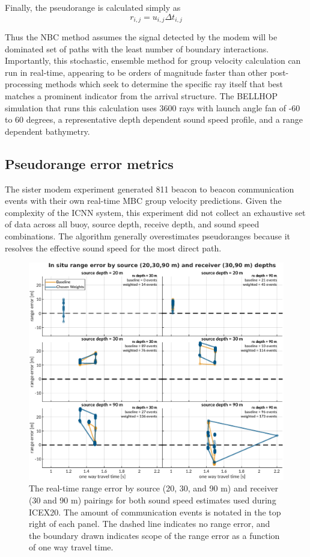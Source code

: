 Finally, the pseudorange is calculated simply as
\begin{equation}
r_{i,j} = u_{i,j} \Delta t_{i,j} 
\end{equation}

Thus the NBC method assumes the signal detected by the modem will be dominated set of paths with the least number of boundary interactions.
Importantly, this stochastic, ensemble method for group velocity calculation can run in real-time, appearing to be orders of magnitude faster than other post-processing methods which seek to determine the specific ray itself that best matches a prominent indicator from the arrival structure.
The BELLHOP simulation that runs this calculation uses 3600 rays with launch angle fan of -60 to 60 degrees, a representative depth dependent sound speed profile, and a range dependent bathymetry. 

\subsection{Pseudorange error metrics}

The sister modem experiment generated 811 beacon to beacon communication events with their own real-time MBC group velocity predictions.
Given the complexity of the ICNN system, this experiment did not collect an exhaustive set of data across all buoy, source depth, receive depth, and sound speed combinations.
 The algorithm generally overestimates pseudoranges because it resolves the effective sound speed for the most direct path.

\begin{figure}[h!]
  \centering
  \includegraphics[width=\reprintcolumnwidth]{figs/range-error-insitu.pdf}
  \caption{The real-time range error by source (20, 30, and 90 m) and receiver (30 and 90 m) pairings for both sound speed estimates used during ICEX20. The amount of communication events is notated in the top right of each panel. The dashed line indicates no range error, and the boundary drawn indicates scope of the range error as a function of one way travel time.}
  \label{fig:range-error-insitu}
\end{figure}

